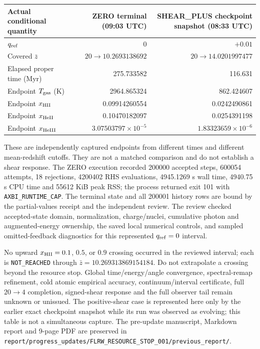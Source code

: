 \documentclass[11pt]{article}
\begin{document}
\begin{center}
\begin{tabular}{lrr}\toprule
Actual conditional quantity & ZERO terminal (09:03 UTC) & SHEAR\_PLUS checkpoint snapshot (08:33 UTC)\\\midrule
$q_{\rm ref}$ & 0 & $+0.01$\\
Covered $\bar z$ & $20\to10.2693138692$ & $20\to14.0201997477$\\
Elapsed proper time (Myr) & 275.733582 & 116.631\\
Endpoint $T_{\rm gas}$ (K) & 2964.865324 & 862.424607\\
Endpoint $x_{\rm HII}$ & 0.09914260554 & 0.0242490861\\
Endpoint $x_{\rm HeII}$ & 0.10470182097 & 0.0254391198\\
Endpoint $x_{\rm HeIII}$ & $3.07503797\times10^{-5}$ & $1.83323659\times10^{-6}$\\
\bottomrule
\end{tabular}
\end{center}

These are independently captured endpoints from different times and different mean-redshift cutoffs. They are not a matched comparison and do not establish a shear response. The ZERO execution recorded 200000 accepted steps, 600054 attempts, 18 rejections, 4200402 RHS evaluations, 4945.1269 s wall time, 4940.75 s CPU time and 55612 KiB peak RSS; the process returned exit 101 with \texttt{AXBI\_RUNTIME\_CAP}. The terminal state and all 200001 history rows are bound by the partial-values receipt and the independent review. The review checked accepted-state domain, normalization, charge/nuclei, cumulative photon and augmented-energy ownership, the saved local numerical controls, and sampled omitted-feedback diagnostics for this represented $q_{\rm ref}=0$ interval.

No upward $x_{\rm HII}=0.1$, $0.5$, or $0.9$ crossing occurred in the reviewed interval; each is \texttt{NOT\_REACHED} through $\bar z=10.269313869154184$. Do not extrapolate a crossing beyond the resource stop. Global time/energy/angle convergence, spectral-remap refinement, cold atomic empirical accuracy, continuum/interval certificate, full $20\to4$ completion, signed-shear response and the full observer tail remain unknown or unissued. The positive-shear case is represented here only by the earlier exact checkpoint snapshot while its run was observed as evolving; this table is not a simultaneous capture. The pre-update manuscript, Markdown report and 9-page PDF are preserved in \texttt{report/progress\_updates/FLRW\_RESOURCE\_STOP\_001/previous\_report/}.
\end{document}
